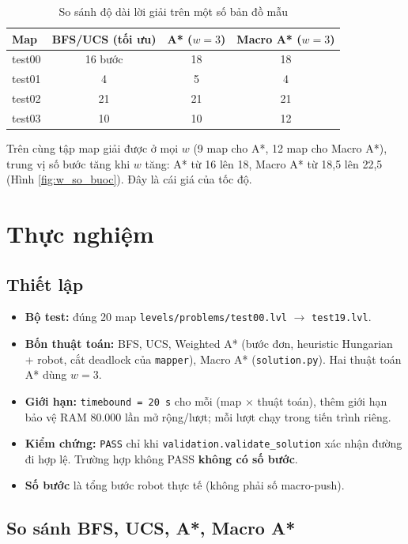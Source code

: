 \documentclass[a4paper,12pt]{article}
\begin{document}
\begin{table}[H]
\centering
\begin{tabular}{lccc}
\toprule
\textbf{Map} & \textbf{BFS/UCS (tối ưu)} & \textbf{A* ($w=3$)} & \textbf{Macro A* ($w=3$)} \\
\midrule
test00 & 16 bước & 18 & 18 \\
test01 & 4 & 5 & 4 \\
test02 & 21 & 21 & 21 \\
test03 & 10 & 10 & 12 \\
\bottomrule
\end{tabular}
\caption{So sánh độ dài lời giải trên một số bản đồ mẫu}
\end{table}

Trên cùng tập map giải được ở mọi $w$ (9 map cho A*, 12 map cho Macro A*), trung vị số bước tăng khi $w$ tăng: A* từ 16 lên 18, Macro A* từ 18,5 lên 22,5 (Hình \ref{fig:w_so_buoc}). Đây là cái giá của tốc độ.

\section{Thực nghiệm}
\label{sec:thuc_nghiem}

\subsection{Thiết lập}

\begin{itemize}
    \item \textbf{Bộ test:} đúng 20 map \texttt{levels/problems/test00.lvl} $\rightarrow$ \texttt{test19.lvl}.
    \item \textbf{Bốn thuật toán:} BFS, UCS, Weighted A* (bước đơn, heuristic Hungarian + robot, cắt deadlock của \texttt{mapper}), Macro A* (\texttt{solution.py}). Hai thuật toán A* dùng $w = 3$.
    \item \textbf{Giới hạn:} \texttt{timebound = 20 s} cho mỗi (map $\times$ thuật toán), thêm giới hạn bảo vệ RAM 80.000 lần mở rộng/lượt; mỗi lượt chạy trong tiến trình riêng.
    \item \textbf{Kiểm chứng:} \texttt{PASS} chỉ khi \texttt{validation.validate\_solution} xác nhận đường đi hợp lệ. Trường hợp không PASS \textbf{không có số bước}.
    \item \textbf{Số bước} là tổng bước robot thực tế (không phải số macro-push).
\end{itemize}

\subsection{So sánh BFS, UCS, A*, Macro A*}
\end{document}
